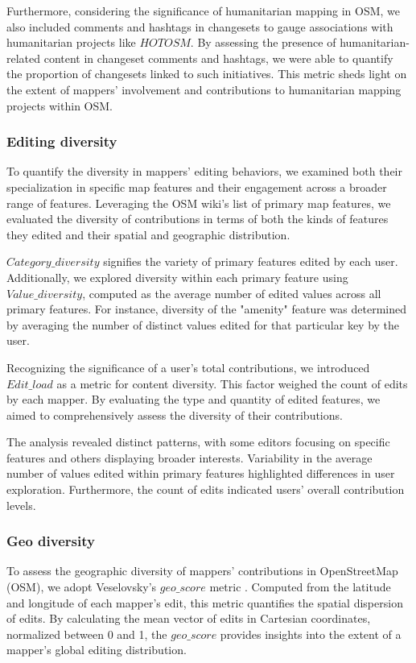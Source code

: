 \documentclass[manuscript,screen,review]{acmart}
\begin{document}
Furthermore, considering the significance of humanitarian mapping in OSM, we also included comments and hashtags in changesets to gauge associations with humanitarian projects like $HOTOSM$\cite{Hotosm}. By assessing the presence of humanitarian-related content in changeset comments and hashtags, we were able to quantify the proportion of changesets linked to such initiatives. This metric sheds light on the extent of mappers' involvement and contributions to humanitarian mapping projects within OSM.

\subsubsection{Editing diversity}

To quantify the diversity in mappers' editing behaviors, we examined both their specialization in specific map features and their engagement across a broader range of features. Leveraging the OSM wiki's list of primary map features, we evaluated the diversity of contributions in terms of both the kinds of features they edited and their spatial and geographic distribution.

$Category\_diversity$ signifies the variety of primary features edited by each user. Additionally, we explored diversity within each primary feature using $Value\_diversity$, computed as the average number of edited values across all primary features. For instance, diversity of the "amenity" feature was determined by averaging the number of distinct values edited for that particular key by the user.

Recognizing the significance of a user's total contributions, we introduced $Edit\_load$ as a metric for content diversity. This factor weighed the count of edits by each mapper. By evaluating the type and quantity of edited features, we aimed to comprehensively assess the diversity of their contributions.

The analysis revealed distinct patterns, with some editors focusing on specific features and others displaying broader interests. Variability in the average number of values edited within primary features highlighted differences in user exploration. Furthermore, the count of edits indicated users' overall contribution levels. 

\subsubsection{Geo diversity}

To assess the geographic diversity of mappers' contributions in OpenStreetMap (OSM), we adopt Veselovsky's $geo\_score$ metric \cite{Veselovsky22}. Computed from the latitude and longitude of each mapper's edit, this metric quantifies the spatial dispersion of edits. By calculating the mean vector of edits in Cartesian coordinates, normalized between 0 and 1, the $geo\_score$ provides insights into the extent of a mapper's global editing distribution.
\end{document}
